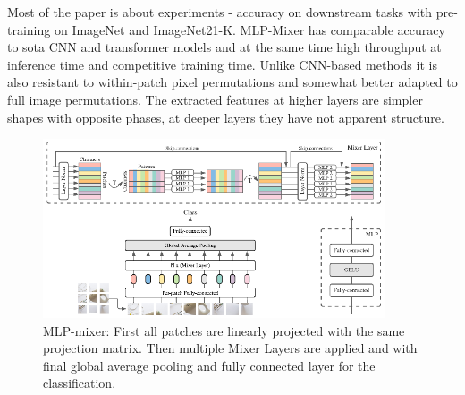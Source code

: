 Most of the paper is about experiments - accuracy on downstream tasks with pre-training on ImageNet and ImageNet21-K.
MLP-Mixer has comparable accuracy to sota CNN and transformer models and at the same time high throughput at inference time and competitive training time.
Unlike CNN-based methods it is also resistant to within-patch pixel permutations and somewhat better adapted to full image permutations.
The extracted features at higher layers are simpler shapes with opposite phases, at deeper layers they have not apparent structure.

\begin{figure}[ht]
\centering
\includegraphics[width=0.9\textwidth]{mlpmixer_Figure1.png}
\caption{MLP-mixer: First all patches are linearly projected with the same projection matrix. Then multiple Mixer Layers are applied and with final global average pooling and fully connected layer for the classification.}
\end{figure}

